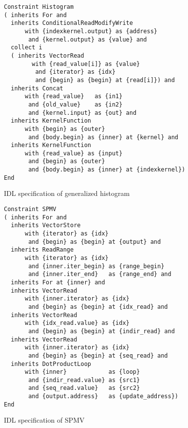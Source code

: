 \begin{figure}[p]
\begin{lstlisting}[language={constraints},numbers=none,xleftmargin=0cm,framexleftmargin=0em,basicstyle=\linespread{1.133}\scriptsize\ttfamily]
Constraint Histogram
( inherits For and
  inherits ConditionalReadModifyWrite
      with {indexkernel.output} as {address}
       and {kernel.output} as {value} and
  collect i
  ( inherits VectorRead
        with {read_value[i]} as {value}
         and {iterator} as {idx}
         and {begin} as {begin} at {read[i]}) and
  inherits Concat
      with {read_value}   as {in1}
       and {old_value}    as {in2}
       and {kernel.input} as {out} and
  inherits KernelFunction
      with {begin} as {outer}
       and {body.begin} as {inner} at {kernel} and
  inherits KernelFunction
      with {read_value} as {input}
       and {begin} as {outer}
       and {body.begin} as {inner} at {indexkernel})
End
\end{lstlisting}
\vspace{-.3cm}
\caption{IDL specification of generalized histogram}
\label{fig:histogram}
\end{figure}

\begin{figure}[p]
\begin{lstlisting}[language={constraints},numbers=none,xleftmargin=0cm,framexleftmargin=0em,basicstyle=\linespread{1.133}\scriptsize\ttfamily]
Constraint SPMV
( inherits For and
  inherits VectorStore
      with {iterator} as {idx}
       and {begin} as {begin} at {output} and
  inherits ReadRange
      with {iterator} as {idx} 
       and {inner.iter_begin} as {range_begin} 
       and {inner.iter_end}   as {range_end} and
  inherits For at {inner} and
  inherits VectorRead
      with {inner.iterator} as {idx}
       and {begin} as {begin} at {idx_read} and
  inherits VectorRead
      with {idx_read.value} as {idx}
       and {begin} as {begin} at {indir_read} and
  inherits VectorRead
      with {inner.iterator} as {idx}
       and {begin} as {begin} at {seq_read} and
  inherits DotProductLoop
      with {inner}            as {loop}
       and {indir_read.value} as {src1}
       and {seq_read.value}   as {src2}
       and {output.address}   as {update_address})
End
\end{lstlisting}
\vspace{-.3cm}
\caption{IDL specification of SPMV}
\label{fig:spmv}
\vspace{.3cm}
\end{figure}

